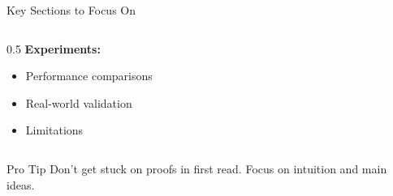 \documentclass[aspectratio=169,xcolor=dvipsnames]{beamer}
\begin{document}
\begin{frame}{Key Sections to Focus On}
\begin{columns}
\begin{column}{0.5\textwidth}
      \vspace{0.2cm}
      \textbf{Experiments:}
      \begin{itemize}
        \item Performance comparisons
        \item Real-world validation
        \item Limitations
      \end{itemize}
    \end{column}
  \end{columns}

  \vspace{0.3cm}
  \begin{alertblock}{Pro Tip}
    Don't get stuck on proofs in first read. Focus on intuition and main ideas.
  \end{alertblock}
\end{frame}
\end{document}
